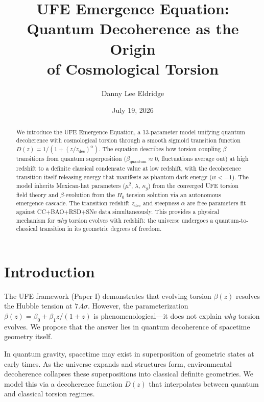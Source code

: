 \documentclass[twocolumn,prd,superscriptaddress,nofootinbib]{revtex4-2}
\begin{document}
\title{UFE Emergence Equation: Quantum Decoherence as the Origin\\
of Cosmological Torsion}

\author{Danny Lee Eldridge}
\date{July 19, 2026}

\begin{abstract}
We introduce the UFE Emergence Equation, a 13-parameter model unifying quantum decoherence with cosmological torsion through a smooth sigmoid transition function $D(z) = 1/(1 + (z/z_\text{dec})^\alpha)$. The equation describes how torsion coupling $\beta$ transitions from quantum superposition ($\beta_\text{quantum} \approx 0$, fluctuations average out) at high redshift to a definite classical condensate value at low redshift, with the decoherence transition itself releasing energy that manifests as phantom dark energy ($w < -1$). The model inherits Mexican-hat parameters ($\mu^2$, $\lambda$, $\kappa_g$) from the converged UFE torsion field theory and $\beta$-evolution from the $H_0$ tension solution via an autonomous emergence cascade. The transition redshift $z_\text{dec}$ and steepness $\alpha$ are free parameters fit against CC+BAO+RSD+SNe data simultaneously. This provides a physical mechanism for \emph{why} torsion evolves with redshift: the universe undergoes a quantum-to-classical transition in its geometric degrees of freedom.
\end{abstract}

\maketitle

\section{Introduction}

The UFE framework (Paper I) demonstrates that evolving torsion $\beta(z)$ resolves the Hubble tension at $7.4\sigma$. However, the parameterization $\beta(z) = \beta_0 + \beta_1 z/(1+z)$ is phenomenological---it does not explain \emph{why} torsion evolves. We propose that the answer lies in quantum decoherence of spacetime geometry itself.

In quantum gravity, spacetime may exist in superposition of geometric states at early times. As the universe expands and structures form, environmental decoherence collapses these superpositions into classical definite geometries. We model this via a decoherence function $D(z)$ that interpolates between quantum and classical torsion regimes.
\end{document}
